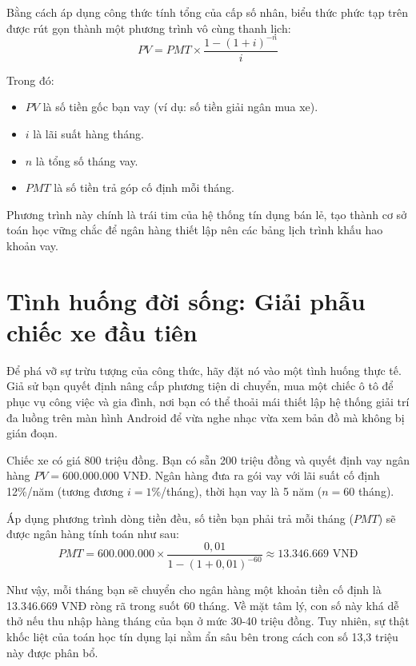 \documentclass[14pt, a4paper, oneside]{extreport}
\begin{document}
Bằng cách áp dụng công thức tính tổng của cấp số nhân, biểu thức phức tạp trên được rút gọn thành một phương trình vô cùng thanh lịch:
\begin{equation}
    PV = PMT \times \frac{1 - (1+i)^{-n}}{i}
\end{equation}

Trong đó:
\begin{itemize}
    \item $PV$ là số tiền gốc bạn vay (ví dụ: số tiền giải ngân mua xe).
    \item $i$ là lãi suất hàng tháng.
    \item $n$ là tổng số tháng vay.
    \item $PMT$ là số tiền trả góp cố định mỗi tháng.
\end{itemize}

Phương trình này chính là trái tim của hệ thống tín dụng bán lẻ, tạo thành cơ sở toán học vững chắc để ngân hàng thiết lập nên các bảng lịch trình khấu hao khoản vay.

\section{Tình huống đời sống: Giải phẫu chiếc xe đầu tiên}

Để phá vỡ sự trừu tượng của công thức, hãy đặt nó vào một tình huống thực tế. Giả sử bạn quyết định nâng cấp phương tiện di chuyển, mua một chiếc ô tô để phục vụ công việc và gia đình, nơi bạn có thể thoải mái thiết lập hệ thống giải trí đa luồng trên màn hình Android để vừa nghe nhạc vừa xem bản đồ mà không bị gián đoạn.

\begin{tcolorbox}[colback=blue!5!white, colframe=blue!75!black, 
                  title=\textbf{Bài toán vay mua ô tô}, arc=2mm]
Chiếc xe có giá 800 triệu đồng. Bạn có sẵn 200 triệu đồng và quyết định vay ngân hàng $PV = 600.000.000$ VNĐ. Ngân hàng đưa ra gói vay với lãi suất cố định 12\%/năm (tương đương $i = 1\%$/tháng), thời hạn vay là 5 năm ($n = 60$ tháng).
\end{tcolorbox}

Áp dụng phương trình dòng tiền đều, số tiền bạn phải trả mỗi tháng ($PMT$) sẽ được ngân hàng tính toán như sau:
\begin{equation}
    PMT = 600.000.000 \times \frac{0,01}{1 - (1 + 0,01)^{-60}} \approx 13.346.669 \text{ VNĐ}
\end{equation}

Như vậy, mỗi tháng bạn sẽ chuyển cho ngân hàng một khoản tiền cố định là 13.346.669 VNĐ ròng rã trong suốt 60 tháng. Về mặt tâm lý, con số này khá dễ thở nếu thu nhập hàng tháng của bạn ở mức 30-40 triệu đồng. Tuy nhiên, sự thật khốc liệt của toán học tín dụng lại nằm ẩn sâu bên trong cách con số 13,3 triệu này được phân bổ.
\end{document}
